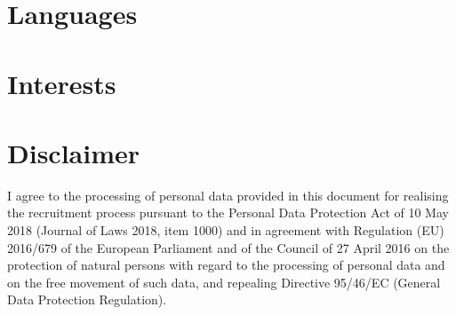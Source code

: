 \documentclass[11pt,a4paper,sans]{moderncv}
\begin{document}
\section{Languages}


\section{Interests}

\section{Disclaimer}

I agree to the processing of personal data provided in this document for 
realising the recruitment process pursuant to the Personal Data Protection Act 
of 10 May 2018 (Journal of Laws 2018, item 1000) and in agreement with 
Regulation (EU) 2016/679 of the European Parliament and of the Council of 27 
April 2016 on the protection of natural persons with regard to the processing 
of personal data and on the free movement of such data, and repealing Directive 
95/46/EC (General Data Protection Regulation).



\end{document}
